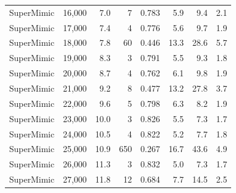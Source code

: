 \begin{tabular}{lrrrrrrr}
SuperMimic & 16,000 & 7.0 & 7 & 0.783 & 5.9 & 9.4 & 2.1 \\
SuperMimic & 17,000 & 7.4 & 4 & 0.776 & 5.6 & 9.7 & 1.9 \\
SuperMimic & 18,000 & 7.8 & 60 & 0.446 & 13.3 & 28.6 & 5.7 \\
SuperMimic & 19,000 & 8.3 & 3 & 0.791 & 5.5 & 9.3 & 1.8 \\
SuperMimic & 20,000 & 8.7 & 4 & 0.762 & 6.1 & 9.8 & 1.9 \\
SuperMimic & 21,000 & 9.2 & 8 & 0.477 & 13.2 & 27.8 & 3.7 \\
SuperMimic & 22,000 & 9.6 & 5 & 0.798 & 6.3 & 8.2 & 1.9 \\
SuperMimic & 23,000 & 10.0 & 3 & 0.826 & 5.5 & 7.3 & 1.7 \\
SuperMimic & 24,000 & 10.5 & 4 & 0.822 & 5.2 & 7.7 & 1.8 \\
SuperMimic & 25,000 & 10.9 & 650 & 0.267 & 16.7 & 43.6 & 4.9 \\
SuperMimic & 26,000 & 11.3 & 3 & 0.832 & 5.0 & 7.3 & 1.7 \\
SuperMimic & 27,000 & 11.8 & 12 & 0.684 & 7.7 & 14.5 & 2.5 \\
\bottomrule\end{tabular}
